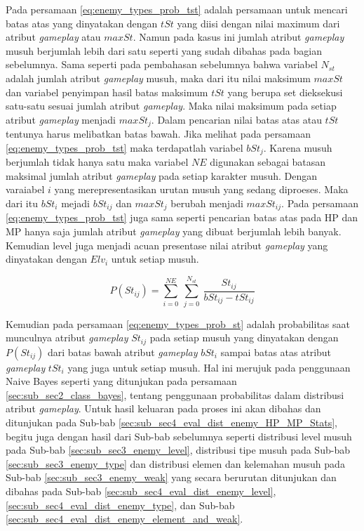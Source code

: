 Pada persamaan \ref{eq:enemy_types_prob_tst} adalah persamaan untuk mencari batas atas yang dinyatakan dengan $tSt$ yang diisi dengan nilai maximum dari atribut \textit{gameplay} atau $maxSt$. Namun pada kasus ini jumlah atribut \textit{gameplay} musuh berjumlah lebih dari satu seperti yang sudah dibahas pada bagian sebelumnya. Sama seperti pada pembahasan sebelumnya bahwa variabel $N_{st}$ adalah jumlah atribut \textit{gameplay} musuh, maka dari itu nilai maksimum $maxSt$ dan variabel penyimpan hasil batas maksimum $tSt$ yang berupa set dieksekusi satu-satu sesuai jumlah atribut \textit{gameplay}. Maka nilai maksimum pada setiap atribut \textit{gameplay} menjadi $maxSt_{j}$. Dalam pencarian nilai batas atas atau $tSt$ tentunya harus melibatkan batas bawah. Jika melihat pada persamaan \ref{eq:enemy_types_prob_tst} maka terdapatlah variabel $bSt_{j}$. Karena musuh berjumlah tidak hanya satu maka variabel $NE$ digunakan sebagai batasan maksimal jumlah atribut \textit{gameplay} pada setiap karakter musuh. Dengan varaiabel $i$ yang merepresentasikan urutan musuh yang sedang diproeses. Maka dari itu $bSt_{i}$ mejadi $bSt_{ij}$ dan $maxSt_{j}$ berubah menjadi $maxSt_{ij}$. Pada persamaan \ref{eq:enemy_types_prob_tst} juga sama seperti pencarian batas atas pada HP dan MP hanya saja jumlah atribut \textit{gameplay} yang dibuat berjumlah lebih banyak. Kemudian level juga menjadi acuan presentase nilai atribut \textit{gameplay} yang dinyatakan dengan $Elv_{i}$ untuk setiap musuh.
\vspace{1ex}

\begin{equation}\label{eq:enemy_types_prob_st}
P(St_{ij}) = \sum_{i=0}^{NE}\ \sum_{j=0}^{N_{st}}\ \frac{St_{ij}}{bSt_{ij} - tSt_{ij}}
\end{equation}

Kemudian pada persamaan \ref{eq:enemy_types_prob_st} adalah probabilitas saat munculnya atribut \textit{gameplay} $St_{ij}$ pada setiap musuh yang dinyatakan dengan $P(St_{ij})$ dari batas bawah atribut \textit{gameplay} $bSt_{i}$ sampai batas atas atribut \textit{gameplay} $tSt_{i}$ yang juga untuk setiap musuh. Hal ini merujuk pada penggunaan Naive Bayes seperti yang ditunjukan pada persamaan \ref{sec:sub_sec2_class_bayes}, tentang penggunaan probabilitas dalam distribusi atribut \textit{gameplay}. Untuk hasil keluaran pada proses ini akan dibahas dan ditunjukan pada Sub-bab \ref{sec:sub_sec4_eval_dist_enemy_HP_MP_Stats}, begitu juga dengan hasil dari Sub-bab sebelumnya seperti distribusi level musuh pada Sub-bab \ref{sec:sub_sec3_enemy_level}, distribusi tipe musuh pada Sub-bab \ref{sec:sub_sec3_enemy_type} dan distribusi elemen dan kelemahan musuh pada Sub-bab \ref{sec:sub_sec3_enemy_weak} yang secara berurutan ditunjukan dan dibahas pada Sub-bab \ref{sec:sub_sec4_eval_dist_enemy_level}, \ref{sec:sub_sec4_eval_dist_enemy_type}, dan Sub-bab \ref{sec:sub_sec4_eval_dist_enemy_element_and_weak}. 
\vspace{1ex}

